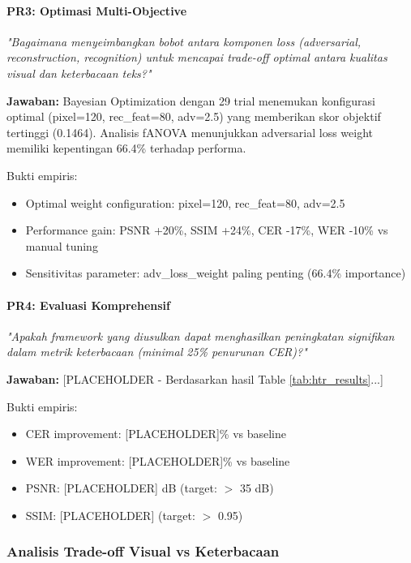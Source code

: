 \documentclass{article}
\begin{document}
\paragraph{PR3: Optimasi Multi-Objective}

\textit{"Bagaimana menyeimbangkan bobot antara komponen loss (adversarial, reconstruction, recognition) untuk mencapai trade-off optimal antara kualitas visual dan keterbacaan teks?"}

\textbf{Jawaban:} Bayesian Optimization dengan 29 trial menemukan konfigurasi optimal (pixel=120, rec\_feat=80, adv=2.5) yang memberikan skor objektif tertinggi (0.1464). Analisis fANOVA menunjukkan adversarial loss weight memiliki kepentingan 66.4\% terhadap performa.

Bukti empiris:
\begin{itemize}
    \item Optimal weight configuration: pixel=120, rec\_feat=80, adv=2.5
    \item Performance gain: PSNR +20\%, SSIM +24\%, CER -17\%, WER -10\% vs manual tuning
    \item Sensitivitas parameter: adv\_loss\_weight paling penting (66.4\% importance)
\end{itemize}

\paragraph{PR4: Evaluasi Komprehensif}

\textit{"Apakah framework yang diusulkan dapat menghasilkan peningkatan signifikan dalam metrik keterbacaan (minimal 25\% penurunan CER)?"}

\textbf{Jawaban:} [PLACEHOLDER - Berdasarkan hasil Table \ref{tab:htr_results}...]

Bukti empiris:
\begin{itemize}
    \item CER improvement: [PLACEHOLDER]\% vs baseline
    \item WER improvement: [PLACEHOLDER]\% vs baseline
    \item PSNR: [PLACEHOLDER] dB (target: $>$ 35 dB)
    \item SSIM: [PLACEHOLDER] (target: $>$ 0.95)
\end{itemize}

\subsubsection{Analisis Trade-off Visual vs Keterbacaan}
\end{document}
